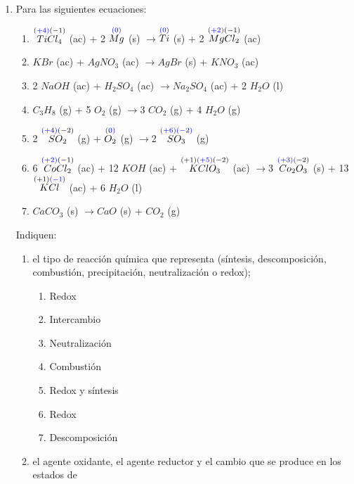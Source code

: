 \documentclass[../Práctica.root.tex]{subfiles}
\newcommand{\lra}{\ensuremath{\longrightarrow{}}}
\newcommand{\sr}[2]{\stackrel{#1}{#2}}
\begin{document}
\begin{enumerate}
    \item Para las siguientes ecuaciones: \\
          \begin{enumerate}
              \item $\sr{\blue{(+4)}(-1)}{TiCl_4}$ (ac) + 2 $\sr{\blue{(0)}}{Mg}$ (s)
                    \lra $\sr{\blue{(0)}}{Ti}$ (s) + 2 $\sr{\blue{(+2)}(-1)}{MgCl_2}$ (ac)
              \item $KBr$ (ac) + $AgNO_3$ (ac)
                    \lra $AgBr$ (s) + $KNO_3$ (ac)
              \item 2 $NaOH$ (ac) + $H_2SO_4$ (ac)
                    \lra $Na_2SO_4$ (ac) + 2 $H_2O$ (l)
              \item $C_3H_8$ (g) + 5 $O_2$ (g) \lra 3 $CO_2$ (g) + 4 $H_2O$ (g)
              \item 2 $\sr{\blue{(+4)}(-2)}{SO_2}$ (g) + $\sr{\blue{(0)}}{O_2}$ (g)
                    \lra 2 $\sr{\blue{(+6)(-2)}}{SO_3}$ (g)
              \item 6 $\sr{\blue{(+2)}(-1)}{CoCl_2}$ (ac) + 12 $KOH$ (ac) + $\sr{(+1)\blue{(+5)}(-2)}{KClO_3}$ (ac)
                    \lra 3 $\sr{\blue{(+3)}(-2)}{Co_2O_3}$ (s) + 13 $\sr{(+1)\blue{(-1)}}{KCl}$ (ac) + 6 $H_2O$ (l)
              \item $CaCO_3$ (s) \lra $CaO$ (s) + $CO_2$ (g)
          \end{enumerate}
          Indiquen:
          \begin{enumerate}
              \item el tipo de reacción química que representa (síntesis, descomposición, combustión,
                    precipitación, neutralización o redox);
                    \begin{enumerate}[label=\alph*)]
                        \item Redox
                        \item Intercambio
                        \item Neutralización
                        \item Combustión
                        \item Redox y síntesis
                        \item Redox
                        \item Descomposición
                    \end{enumerate}
              \item el agente oxidante, el agente reductor y el cambio que se produce en los estados de

\end{enumerate}
\end{enumerate}
\end{document}
